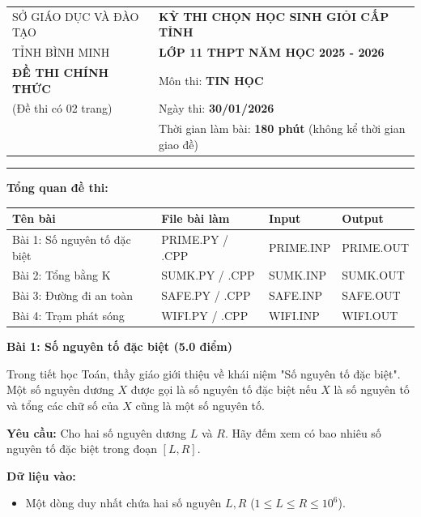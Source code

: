 \documentclass[11pt, a4paper]{article}
\newcommand{\bai}[2]{\vspace{0.5cm}\noindent\textbf{\large Bài #1: #2}}
\begin{document}
\begin{center}
    \begin{tabular}{>{\centering\arraybackslash}p{} >{\centering\arraybackslash}p{}}
        SỞ GIÁO DỤC VÀ ĐÀO TẠO & \textbf{KỲ THI CHỌN HỌC SINH GIỎI CẤP TỈNH} \\
        TỈNH BÌNH MINH & \textbf{LỚP 11 THPT NĂM HỌC 2025 - 2026} \\
        \textbf{ĐỀ THI CHÍNH THỨC} & Môn thi: \textbf{TIN HỌC} \\
        (Đề thi có 02 trang) & Ngày thi: \textbf{30/01/2026} \\
         & Thời gian làm bài: \textbf{180 phút} (không kể thời gian giao đề)
    \end{tabular}
\end{center}
\hrule
\vspace{0.3cm}

\textbf{Tổng quan đề thi:}
\begin{center}
\begin{tabular}{|l|l|l|l|}
\hline
\textbf{Tên bài} & \textbf{File bài làm} & \textbf{Input} & \textbf{Output} \\ \hline
Bài 1: Số nguyên tố đặc biệt & PRIME.PY / .CPP & PRIME.INP & PRIME.OUT \\ \hline
Bài 2: Tổng bằng K & SUMK.PY / .CPP & SUMK.INP & SUMK.OUT \\ \hline
Bài 3: Đường đi an toàn & SAFE.PY / .CPP & SAFE.INP & SAFE.OUT \\ \hline
Bài 4: Trạm phát sóng & WIFI.PY / .CPP & WIFI.INP & WIFI.OUT \\ \hline
\end{tabular}
\end{center}

\vspace{0.3cm}

\bai{1}{Số nguyên tố đặc biệt (5.0 điểm)}

Trong tiết học Toán, thầy giáo giới thiệu về khái niệm "Số nguyên tố đặc biệt". Một số nguyên dương $X$ được gọi là số nguyên tố đặc biệt nếu $X$ là số nguyên tố và tổng các chữ số của $X$ cũng là một số nguyên tố.

\textbf{Yêu cầu:} Cho hai số nguyên dương $L$ và $R$. Hãy đếm xem có bao nhiêu số nguyên tố đặc biệt trong đoạn $[L, R]$.

\textbf{Dữ liệu vào:}
\begin{itemize}
    \item Một dòng duy nhất chứa hai số nguyên $L, R$ ($1 \le L \le R \le 10^6$).
\end{itemize}
\end{document}
